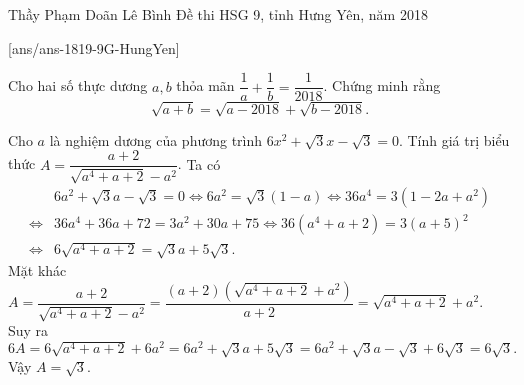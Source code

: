 \begin{name}
{Thầy  Phạm Doãn Lê Bình}
{Đề thi HSG 9, tỉnh Hưng Yên, năm 2018}
\end{name}
\setcounter{ex}{0}
[ans/ans-1819-9G-HungYen]
\begin{ex}%
	Cho hai số thực dương $a,b$ thỏa mãn $\dfrac{1}{a} + \dfrac{1}{b} = \dfrac{1}{2018}$. Chứng minh rằng $$\sqrt{a+b} = \sqrt{a-2018} + \sqrt{b-2018}.$$
\end{ex}

\begin{ex}%
    Cho $a$ là nghiệm dương của phương trình $6x^2 + \sqrt{3}x - \sqrt{3} = 0$. Tính giá trị biểu thức $A = \dfrac{a+2}{\sqrt{a^4+a+2}-a^2}$.
\loigiai
    {
    Ta có 
    \begin{align*}
   &  6a^2 +\sqrt{3}a-\sqrt{3} = 0 \Leftrightarrow 6a^2 = \sqrt{3}(1-a) \Leftrightarrow 36a^4 = 3(1-2a+a^2)\\
    \Leftrightarrow & 36a^4 +36a + 72 = 3a^2 + 30a + 75 \Leftrightarrow 36(a^4+a+2) = 3(a+5)^2 \\
    \Leftrightarrow & 6\sqrt{a^4+a+2} = \sqrt{3}a + 5\sqrt{3}.
    \end{align*}
   Mặt khác $A= \dfrac{a+2}{\sqrt{a^4+a+2}-a^2} = \dfrac{(a+2) \left( \sqrt{a^4+a+2}+a^2 \right)}{a+2} = \sqrt{a^4+a+2}+a^2.$\\
   Suy ra $6A = 6\sqrt{a^4+a+2}+ 6a^2 = 6a^2 + \sqrt{3}a + 5\sqrt{3} = 6a^2 + \sqrt{3}a -\sqrt{3} + 6\sqrt{3} = 6\sqrt{3}.$\\
   Vậy $A =\sqrt{3}.$
    }
\end{ex}

